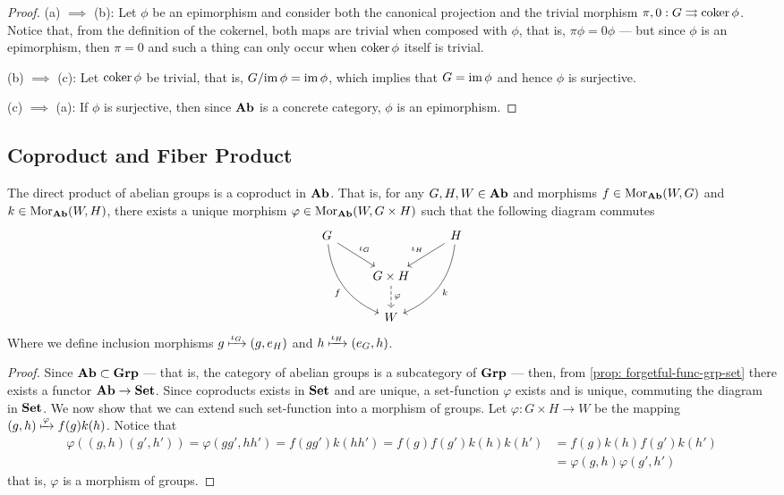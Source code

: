 \begin{proof}
(a) \(\implies\) (b): Let \(\phi\) be an epimorphism and consider both the
canonical projection and the trivial morphism
\(\pi, 0: G \rightrightarrows \operatorname{coker} \phi\). Notice that, from the definition of
the cokernel, both maps are trivial when composed with \(\phi\), that is,
\(\pi \phi = 0 \phi\) --- but since \(\phi\) is an epimorphism, then \(\pi = 0\)
and such a thing can only occur when \(\operatorname{coker} \phi\) itself is trivial.

(b) \(\implies\) (c): Let \(\operatorname{coker} \phi\) be trivial, that is,
\(G/{\operatorname{im} \phi} = \operatorname{im} \phi\), which implies that \(G = \operatorname{im} \phi\) and hence
\(\phi\) is surjective.

(c) \(\implies\) (a): If \(\phi\) is surjective, then since \(\Ab\) is a
concrete category, \(\phi\) is an epimorphism.
\end{proof}

\subsection{Coproduct and Fiber Product}

\begin{proposition}[Coproduct in \(\Ab\)]\label{prop: coprod-ab}
The direct product of abelian groups is a coproduct in \(\Ab\). That is, for any
\(G, H, W \in {\textbf{Ab}}\) and morphisms \(f \in \operatorname{Mor}_{\textbf{Ab}}(W, G)\) and
\(k \in \operatorname{Mor}_{\textbf{Ab}}(W, H)\), there exists a unique morphism
\(\varphi \in \operatorname{Mor}_{\textbf{Ab}}(W, G \times H)\) such that the following diagram commutes
\[
  \begin{tikzcd}
    G \ar[dr, "\iota_G"] \ar[ddr, bend right, swap, "f"] &
    &H \ar[dl, swap, "\iota_H"] \ar[ddl, bend left, "k"] \\
    &G \times H \ar[d, dashed, "\varphi"]  & \\
    &W &
  \end{tikzcd}
\]
Where we define inclusion morphisms \(g \xmapsto{\iota_G} (g, e_H)\) and \(h
\xmapsto{\iota_H} (e_G, h)\).
\end{proposition}

\begin{proof}
Since \({\textbf{Ab}} \subset {\textbf{Grp}}\) --- that is, the category of abelian groups is a
subcategory of \({\textbf{Grp}}\) --- then, from \cref{prop: forgetful-func-grp-set}
there exists a functor \({\textbf{Ab}} \to {\textbf{Set}}\). Since coproducts exists in \({\textbf{Set}}\)
and are unique, a set-function \(\varphi\) exists and is unique, commuting the
diagram in \({\textbf{Set}}\). We now show that we can extend such set-function into a
morphism of groups. Let \(\varphi: G \times H \to W\) be the mapping \((g, h)
\xmapsto \varphi f(g) k(h)\). Notice that
\begin{align*}
  \varphi((g, h)(g', h'))
  = \varphi(gg', hh')
  = f(g g') k(hh')
  = f(g) f(g') k(h) k(h')
  &= f(g) k(h) f(g') k(h') \\
  &= \varphi(g, h) \varphi(g', h')
\end{align*}
that is, \(\varphi\) is a morphism of groups.
\end{proof}

